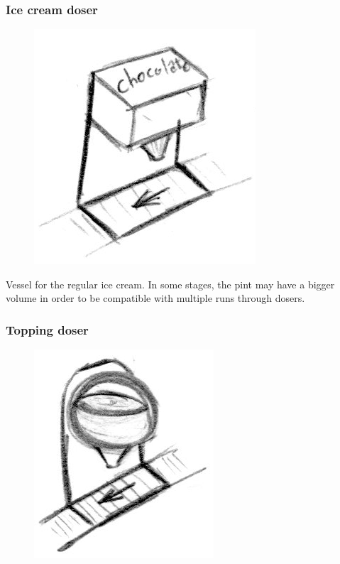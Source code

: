 \documentclass[a4paper]{scrartcl}
\begin{document}
        \subsubsection{Ice cream doser}
            \begin{figure}
                \vspace{-20pt}
                \includegraphics[scale=1]{devices/ice_cream_doser}
                \vspace{-20pt}
            \end{figure}
            
            Vessel for the regular ice cream. In some stages, the pint may have
            a bigger volume in order to be compatible with multiple runs through
            dosers.

        \subsubsection{Topping doser}
            \begin{figure}
                \vspace{-20pt}
                \includegraphics[scale=1]{devices/topping_doser}
                \vspace{-20pt}
            \end{figure}
            
\end{document}
